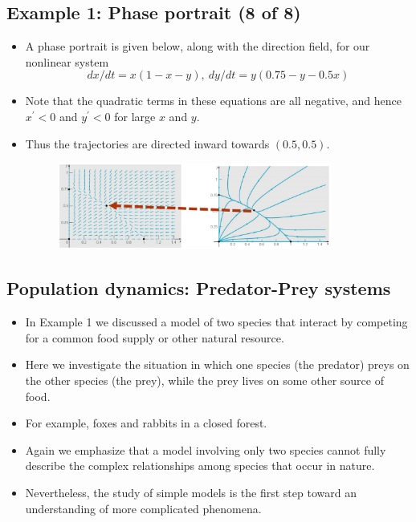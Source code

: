 \documentclass[11pt,a4paper]{article}
\begin{document}
	\subsection*{Example 1: Phase portrait (8 of 8)}
	\begin{itemize}
		\item A phase portrait is given below, along with the direction field, for our nonlinear system
		$$
		dx/dt = x(1-x-y),\ dy/dt = y(0.75 - y - 0.5x)
		$$
		\item Note that the quadratic terms in these equations are all negative, and hence $x^\prime < 0$ and $y^\prime < 0$ for large $x$ and $y$.
		\item Thus the trajectories are directed inward towards $(0.5,0.5)$.
		\begin{figure}[H]
			\centering
			\includegraphics[width=0.85\textwidth]{figure/Lec17f3.PNG}
		\end{figure}
	\end{itemize}
	\subsection*{Population dynamics: Predator-Prey systems}
	\begin{itemize}
		\item In Example 1 we discussed a model of two species that interact by competing for a common food supply or other natural resource.
		\item Here we investigate the situation in which one species (the predator) preys on the other species (the prey), while the prey lives on some other source of food.
		\item For example, foxes and rabbits in a closed forest.
		\item Again we emphasize that a model involving only two species cannot fully describe the complex relationships among species that occur in nature.
		\item Nevertheless, the study of simple models is the first step toward an understanding of more complicated phenomena.
	\end{itemize}
\end{document}
